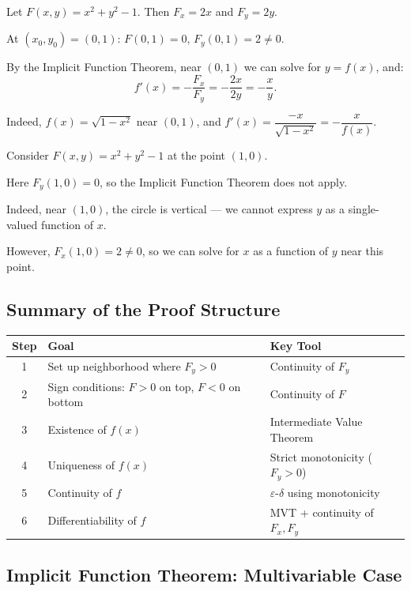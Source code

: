 \documentclass[11pt]{report}
\begin{document}
\begin{example}[Circle]
Let $F(x, y) = x^2 + y^2 - 1$. Then $F_x = 2x$ and $F_y = 2y$.

At $(x_0, y_0) = (0, 1)$: $F(0, 1) = 0$, $F_y(0, 1) = 2 \neq 0$.

By the Implicit Function Theorem, near $(0, 1)$ we can solve for $y = f(x)$, and:
\[
f'(x) = -\frac{F_x}{F_y} = -\frac{2x}{2y} = -\frac{x}{y}.
\]

Indeed, $f(x) = \sqrt{1 - x^2}$ near $(0, 1)$, and $f'(x) = \dfrac{-x}{\sqrt{1 - x^2}} = -\dfrac{x}{f(x)}$. \checkmark
\end{example}

\begin{example}
Consider $F(x, y) = x^2 + y^2 - 1$ at the point $(1, 0)$.

Here $F_y(1, 0) = 0$, so the Implicit Function Theorem does not apply.

Indeed, near $(1, 0)$, the circle is vertical --- we cannot express $y$ as a single-valued function of $x$.

However, $F_x(1, 0) = 2 \neq 0$, so we can solve for $x$ as a function of $y$ near this point.
\end{example}

\subsection*{Summary of the Proof Structure}

\begin{center}
\begin{tabular}{|c|l|l|}
\hline
\textbf{Step} & \textbf{Goal} & \textbf{Key Tool} \\
\hline
1 & Set up neighborhood where $F_y > 0$ & Continuity of $F_y$ \\
\hline
2 & Sign conditions: $F > 0$ on top, $F < 0$ on bottom & Continuity of $F$ \\
\hline
3 & Existence of $f(x)$ & Intermediate Value Theorem \\
\hline
4 & Uniqueness of $f(x)$ & Strict monotonicity ($F_y > 0$) \\
\hline
5 & Continuity of $f$ & $\varepsilon$-$\delta$ using monotonicity \\
\hline
6 & Differentiability of $f$ & MVT + continuity of $F_x, F_y$ \\
\hline
\end{tabular}
\end{center}

\subsection{Implicit Function Theorem: Multivariable Case}
\end{document}
